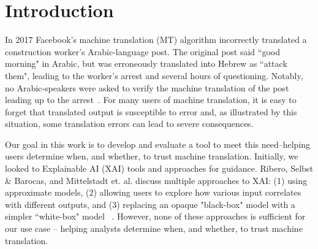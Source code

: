 \section{Introduction}

In 2017 Facebook's machine translation (MT) algorithm incorrectly translated a construction worker's Arabic-language post. The original post said ``good morning" in Arabic, but was erroneously translated into Hebrew as ``attack them", leading to the worker's arrest and several hours of questioning. Notably, no Arabic-speakers were asked to verify the machine translation of the post leading up to the arrest~\cite{hernFacebook2017}. For many users of machine translation, it is easy to forget that translated output is susceptible to error and, as illustrated by this situation, some translation errors can lead to severe consequences. 

Our goal in this work is to develop and evaluate a tool to meet this need--helping users determine when, and whether, to trust machine translation. 
Initially, we looked to Explainable AI (XAI) tools and approaches for guidance.
Ribero, Selbst \& Barocas, and Mittelstadt et. al. discuss multiple approaches to XAI: 
(1) using approximate models, (2) allowing users to explore how various input correlates with different outputs, and (3) replacing an opaque "black-box" model with a simpler “white-box" model ~\cite{RiberoLIME2016, SelbstBarocasIntuitive2018, MittelstadtRussellExplain2019}. However, none of these approaches is sufficient for our use case -- helping analysts determine when, and whether, to trust machine translation.


